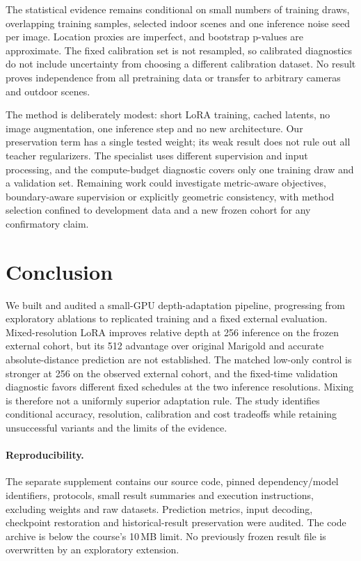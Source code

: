The statistical evidence remains conditional on small numbers of training draws, overlapping training samples, selected indoor scenes and one inference noise seed per image. Location proxies are imperfect, and bootstrap p-values are approximate. The fixed calibration set is not resampled, so calibrated diagnostics do not include uncertainty from choosing a different calibration dataset. No result proves independence from all pretraining data or transfer to arbitrary cameras and outdoor scenes.

The method is deliberately modest: short LoRA training, cached latents, no image augmentation, one inference step and no new architecture. Our preservation term has a single tested weight; its weak result does not rule out all teacher regularizers. The specialist uses different supervision and input processing, and the compute-budget diagnostic covers only one training draw and a validation set. Remaining work could investigate metric-aware objectives, boundary-aware supervision or explicitly geometric consistency, with method selection confined to development data and a new frozen cohort for any confirmatory claim.

\section{Conclusion}
We built and audited a small-GPU depth-adaptation pipeline, progressing from exploratory ablations to replicated training and a fixed external evaluation. Mixed-resolution LoRA improves relative depth at 256 inference on the frozen external cohort, but its 512 advantage over original Marigold and accurate absolute-distance prediction are not established. The matched low-only control is stronger at 256 on the observed external cohort, and the fixed-time validation diagnostic favors different fixed schedules at the two inference resolutions. Mixing is therefore not a uniformly superior adaptation rule. The study identifies conditional accuracy, resolution, calibration and cost tradeoffs while retaining unsuccessful variants and the limits of the evidence.

\paragraph{Reproducibility.}
The separate supplement contains our source code, pinned dependency/model identifiers, protocols, small result summaries and execution instructions, excluding weights and raw datasets. Prediction metrics, input decoding, checkpoint restoration and historical-result preservation were audited. The code archive is below the course's 10\,MB limit. No previously frozen result file is overwritten by an exploratory extension.

